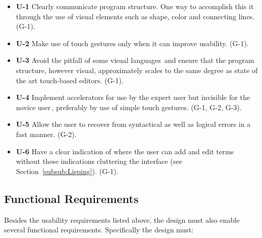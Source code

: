 \begin{itemize}     
	\item \textbf{U-1} Clearly communicate program structure. One way to accomplish this it through the use of visual elements such as shape, color and connecting lines. (G-1).
	\item \textbf{U-2} Make use of touch gestures only when it can improve usability. (G-1).
	\item \textbf{U-3} Avoid the pitfall of some visual languages\,\cite{green1992visual} and ensure that the program structure, however visual, approximately scales to the same degree as state of the art touch-based editors. (G-1).
	\item \textbf{U-4} Implement accelerators for use by the expert user but invisible for the novice user\,\cite{nielsen1990heuristic}, preferably by use of simple touch gestures. (G-1, G-2, G-3).
	\item \textbf{U-5} Allow the user to recover from syntactical as well as logical errors in a fast manner. (G-2).
	\item \textbf{U-6} Have a clear indication of where the user can add and edit terms without these indications cluttering the interface (see Section~\ref{subsub:Lisping}). (G-1).
\end{itemize}

\subsection{Functional Requirements} 
\label{subsec:FunctionalRequirements} 
Besides the usability requirements listed above, the design must also enable several functional requirements. Specifically the design must:

